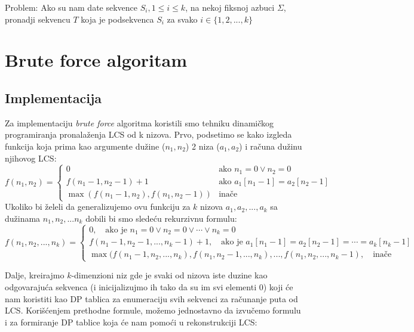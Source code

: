 \documentclass{article}
\begin{document}
    {\large Problem}: Ako su nam date sekvence $S_i, 1 \leq i \leq k$, na nekoj fiksnoj azbuci $\Sigma$, pronadji sekvencu $T$ koja je podsekvenca $S_i$ za svako $i \in \{1,2,...,k\}$


    \section{Brute force algoritam}

    \subsection{Implementacija}
    Za implementaciju \emph{brute force} algoritma koristili smo tehniku dinamičkog programiranja pronalaženja LCS od k nizova. Prvo, podsetimo se kako izgleda funkcija koja prima kao argumente dužine ($n_1, n_2$) 2 niza ($a_1,a_2$) i računa dužinu njihovog LCS:
    $$ f(n_1, n_2) =
    \begin{cases}
        0 & \text{ako } n_1 = 0 \lor n_2 = 0 \\
        f(n_1-1,n_2-1)+1 & \text{ako } a_1[n_1 - 1] = a_2[n_2 - 1] \\
        \max{(f(n_1-1,n_2), f(n_1,n_2-1))} & \text{inače}
    \end{cases}
    $$
    Ukoliko bi želeli da generalizujemo ovu funkciju za $k$ nizova $a_1,a_2,...,a_k$ sa dužinama $n_1, n_2,...n_k$ dobili bi smo sledeću rekurzivnu formulu:
    $$ f(n_1, n_2, ...,n_k) =
    \begin{cases}
        0, \hspace{1em}  \text{ako je } n_1 = 0 \lor n_2 = 0 \lor \cdots \lor n_k = 0 \\
        f(n_1-1,n_2-1,...,n_k-1)+1, \hspace{1em} \text{ako je } a_1[n_1 - 1] = a_2[n_2 - 1] = \cdots = a_k[n_k-1] \\
        \max{(f(n_1-1,n_2,...,n_k), f(n_1,n_2-1,...,n_k), ..., f(n_1,n_2,...,n_k-1)}, \hspace{1em} \text{inače}
    \end{cases}
    $$

    \vspace{7em}

    Dalje, kreirajmo $k$-dimenzioni niz gde je svaki od nizova iste duzine kao odgovarajuća sekvenca (i inicijalizujmo ih tako da su im svi elementi 0) koji će nam koristiti kao DP tablica za enumeraciju svih sekvenci za računanje puta od LCS. Korišćenjem prethodne formule, možemo jednostavno da izvučemo formulu i za formiranje DP tablice koja će nam pomoći u rekonstrukciji LCS:
\end{document}
